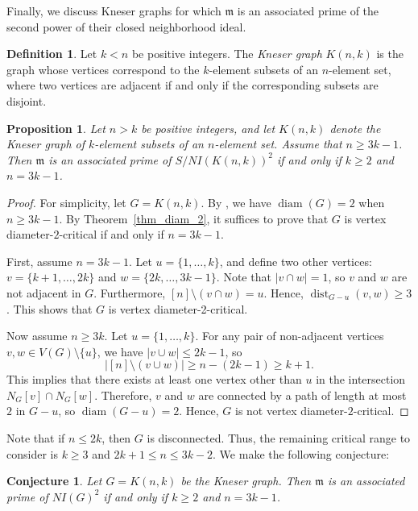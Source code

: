 \documentclass[12pt,reqno,twoside]{amsart}
\newcommand{\mm}{\mathfrak m}
\DeclareMathOperator{\diam}{diam}
\DeclareMathOperator{\dist}{dist}
\newtheorem{prop}[thm]{\bf Proposition}
\newtheorem{conj}[thm]{\bf Conjecture}
\theoremstyle{definition}
\newtheorem{defn}[thm]{\bf Definition}
\theoremstyle{plain}
\theoremstyle{remark}
\numberwithin{equation}{section}
\begin{document}
Finally, we discuss Kneser graphs for which $\mm$ is an associated prime of the second power of their closed neighborhood ideal.

\begin{defn}
Let $k < n$ be positive integers. The \emph{Kneser graph} $K(n,k)$ is the graph whose vertices correspond to the $k$-element subsets of an $n$-element set, where two vertices are adjacent if and only if the corresponding subsets are disjoint.
\end{defn}

\begin{prop}\label{prop_Kneser}
Let $n > k$ be positive integers, and let $K(n,k)$ denote the Kneser graph of $k$-element subsets of an $n$-element set. Assume that $n \geq 3k - 1$. Then $\mm$ is an associated prime of $S/NI(K(n,k))^2$ if and only if $k \geq 2$ and $n = 3k - 1$.
\end{prop}

\begin{proof}
For simplicity, let $G = K(n,k)$. By \cite[Theorem 1]{VV}, we have $\diam(G) = 2$ when $n \geq 3k - 1$. By Theorem~\ref{thm_diam_2}, it suffices to prove that $G$ is vertex diameter-$2$-critical if and only if $n = 3k - 1$.

First, assume $n = 3k - 1$. Let $u = \{1, \ldots, k\}$, and define two other vertices: $v = \{k+1, \ldots, 2k\}$ and $w = \{2k, \ldots, 3k - 1\}$. Note that $|v \cap w| = 1$, so $v$ and $w$ are not adjacent in $G$. Furthermore, $[n] \setminus (v\cap w) = u$. Hence, $\dist_{G - u}(v, w) \geq 3$. This shows that $G$ is vertex diameter-2-critical.

Now assume $n \geq 3k$. Let $u = \{1, \ldots, k\}$. For any pair of non-adjacent vertices $v, w \in V(G) \setminus \{u\}$, we have $|v \cup w| \leq 2k - 1$, so
\[
|[n] \setminus (v \cup w)| \geq n - (2k - 1) \geq k + 1.
\]
This implies that there exists at least one vertex other than $u$ in the intersection $N_G[v] \cap N_G[w]$. Therefore, $v$ and $w$ are connected by a path of length at most $2$ in $G - u$, so $\diam(G - u) = 2$. Hence, $G$ is not vertex diameter-$2$-critical.
\end{proof}

Note that if $n \leq 2k$, then $G$ is disconnected. Thus, the remaining critical range to consider is $k \geq 3$ and $2k + 1 \leq n \leq 3k - 2$. We make the following conjecture:

\begin{conj}
Let $G = K(n,k)$ be the Kneser graph. Then $\mm$ is an associated prime of $NI(G)^2$ if and only if $k \geq 2$ and $n = 3k - 1$.
\end{conj}
\end{document}
